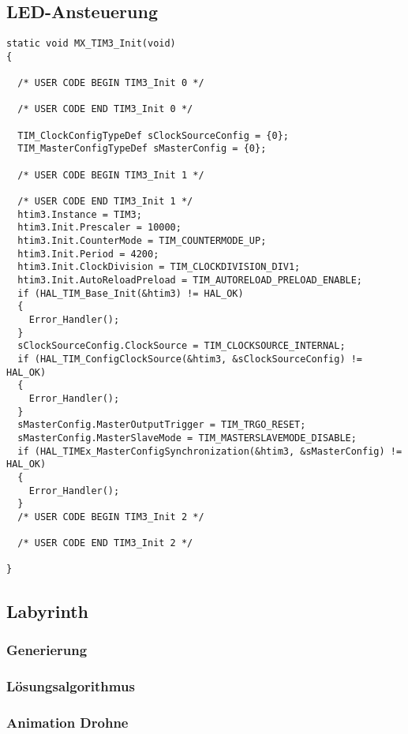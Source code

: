 \subsection{LED-Ansteuerung}
\begin{lstlisting}[style=CStyle]
static void MX_TIM3_Init(void)
{

  /* USER CODE BEGIN TIM3_Init 0 */

  /* USER CODE END TIM3_Init 0 */

  TIM_ClockConfigTypeDef sClockSourceConfig = {0};
  TIM_MasterConfigTypeDef sMasterConfig = {0};

  /* USER CODE BEGIN TIM3_Init 1 */

  /* USER CODE END TIM3_Init 1 */
  htim3.Instance = TIM3;
  htim3.Init.Prescaler = 10000;
  htim3.Init.CounterMode = TIM_COUNTERMODE_UP;
  htim3.Init.Period = 4200;
  htim3.Init.ClockDivision = TIM_CLOCKDIVISION_DIV1;
  htim3.Init.AutoReloadPreload = TIM_AUTORELOAD_PRELOAD_ENABLE;
  if (HAL_TIM_Base_Init(&htim3) != HAL_OK)
  {
    Error_Handler();
  }
  sClockSourceConfig.ClockSource = TIM_CLOCKSOURCE_INTERNAL;
  if (HAL_TIM_ConfigClockSource(&htim3, &sClockSourceConfig) != HAL_OK)
  {
    Error_Handler();
  }
  sMasterConfig.MasterOutputTrigger = TIM_TRGO_RESET;
  sMasterConfig.MasterSlaveMode = TIM_MASTERSLAVEMODE_DISABLE;
  if (HAL_TIMEx_MasterConfigSynchronization(&htim3, &sMasterConfig) != HAL_OK)
  {
    Error_Handler();
  }
  /* USER CODE BEGIN TIM3_Init 2 */

  /* USER CODE END TIM3_Init 2 */

}
\end{lstlisting}
\subsection{Labyrinth} \label{Labyrinth}
\subsubsection{Generierung}
\subsubsection{Lösungsalgorithmus}
\subsubsection{Animation Drohne}